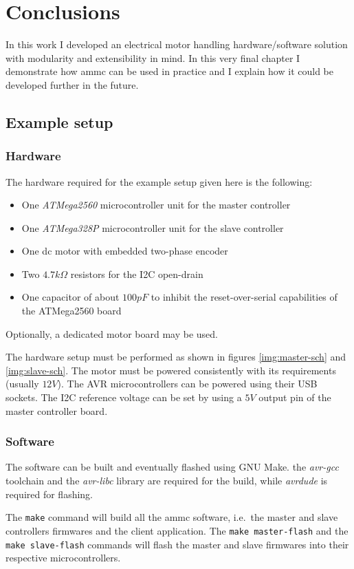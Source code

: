 \chapter{Conclusions}
\label{ch:conclusions}
In this work I developed an electrical motor handling hardware/software
solution with modularity and extensibility in mind. In this very final chapter
I demonstrate how ammc can be used in practice and I explain how it could be
developed further in the future.

\section{Example setup}

\subsection{Hardware}
The hardware required for the example setup given here is the following:
\begin{itemize}
  \item One \emph{ATMega2560} microcontroller unit for the master controller
  \item One \emph{ATMega328P} microcontroller unit for the slave controller
  \item One dc motor with embedded two-phase encoder
  \item Two $4.7 k\Omega$ resistors for the I2C open-drain
  \item One capacitor of about $100 pF$ to inhibit the reset-over-serial
    capabilities of the ATMega2560 board
\end{itemize}
Optionally, a dedicated motor board may be used.

The hardware setup must be performed as shown in figures \ref{img:master-sch}
and \ref{img:slave-sch}.
The motor must be powered consistently with its requirements (usually $12 V$).
The AVR microcontrollers can be powered using their USB sockets. The I2C
reference voltage can be set by using a $5 V$ output pin of the master
controller board.

\subsection{Software}
The software can be built and eventually flashed using GNU Make. the
\emph{avr-gcc} toolchain and the \emph{avr-libc} library are required for the
build, while \emph{avrdude} is required for flashing.

The \texttt{make} command will build all the ammc software, i.e.\ the master
and slave controllers firmwares and the client application. The \texttt{make
master-flash} and the \texttt{make slave-flash} commands will flash the master
and slave firmwares into their respective microcontrollers.

